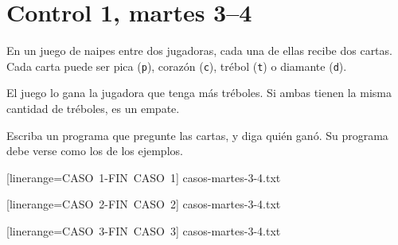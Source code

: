 \documentclass[12pt,spanish,a5paper,landscape]{article}
\begin{document}
  \newpage
  \part*{Control 1, martes 3--4}
  \newpage

  En un juego de naipes entre dos jugadoras,
  cada una de ellas recibe dos cartas.
  Cada carta puede ser
  pica (\verb+p+),
  corazón (\verb+c+),
  trébol (\verb+t+) o
  diamante (\verb+d+).

  El juego lo gana la jugadora que tenga más tréboles.
  Si ambas tienen la misma cantidad de tréboles,
  es un empate.

  Escriba un programa que pregunte las cartas,
  y diga quién ganó.
  Su programa debe verse como los de los ejemplos.

  \begin{minipage}{0.25\textwidth}
      [linerange=CASO\ 1-FIN\ CASO\ 1]%
      {casos-martes-3-4.txt}
  \end{minipage}
  \hspace{1em}
  \begin{minipage}{0.25\textwidth}
      [linerange=CASO\ 2-FIN\ CASO\ 2]%
      {casos-martes-3-4.txt}
  \end{minipage}
  \hspace{1em}
  \begin{minipage}{0.25\textwidth}
      [linerange=CASO\ 3-FIN\ CASO\ 3]%
      {casos-martes-3-4.txt}
  \end{minipage}
\end{document}

